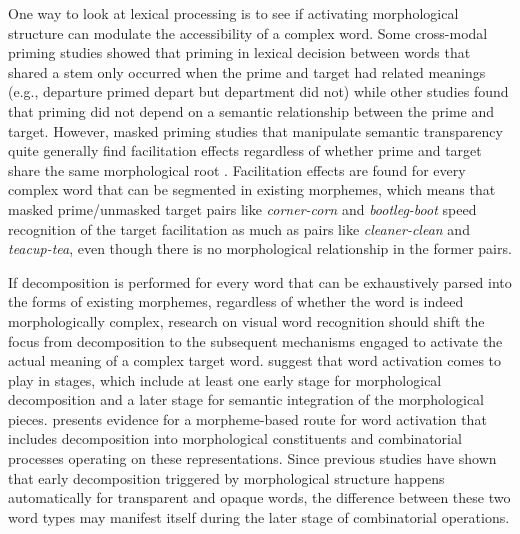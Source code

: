 \documentclass{frontiersSCNS}
\begin{document}
	One way to look at lexical processing is to see if activating morphological structure can modulate the accessibility of a complex word. Some cross-modal priming studies \citep{Marslen-Wilson:1994} showed that priming in lexical decision between words that shared a stem only occurred when the prime and target had related meanings (e.g., departure primed depart but department did not) while other studies \citep*{Zwitserlood:1994} found that priming did not depend on a semantic relationship between the prime and target. However, masked priming studies that manipulate semantic transparency quite generally find facilitation effects regardless of whether prime and target share the same morphological root \citep*{Rastle:2004, Longtin:2003, Fiorentino:2007, McCormick:2008}.  Facilitation effects are found for every complex word that can be segmented in existing morphemes, which means that masked prime/unmasked target pairs like \textit{corner-corn} and \textit{bootleg-boot} speed recognition of the target facilitation as much as pairs like \textit{cleaner-clean} and \textit{teacup-tea}, even though there is no morphological relationship in the former pairs.

	If decomposition is performed for every word that can be exhaustively parsed into the forms of existing morphemes, regardless of whether the word is indeed morphologically complex, research on visual word recognition should shift the focus from decomposition to the subsequent mechanisms engaged to activate the actual meaning of a complex target word.  \citet*{Meunier:2007} suggest that word activation comes to play in stages, which include at least one early stage for morphological decomposition and a later stage for semantic integration of the morphological pieces. \citet*{Fiorentino:2013} presents evidence for a morpheme-based route for word activation that includes decomposition into morphological constituents and combinatorial processes operating on these representations.  Since previous studies have shown that early decomposition triggered by morphological structure happens automatically for transparent and opaque words, the difference between these two word types may manifest itself during the later stage of combinatorial operations.
\end{document}
